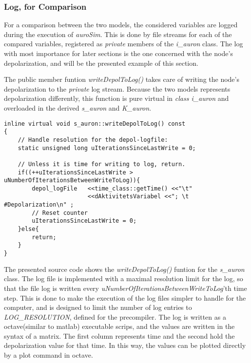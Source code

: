 		\subsubsection{Log, for Comparison}
			For a comparison between the two models, the considered variables are logged during the execution of \emph{auroSim}.
			This is done by file streams for each of the compared variables, registered as \emph{private} members of the \emph{i\_auron} class.
			The log with most importance for later sections is the one concerned with the node's depolarization, and will be the presented example of this section.

			The public member funtion \emph{writeDepolToLog()} takes care of writing the node's depolarization to the \emph{private} log stream.
			Because the two models represents depolarization differently, this function is pure virtual in \emph{class i\_auron} and overloaded in the derived \emph{s\_auron} and \emph{K\_auron}.

\begin{lstlisting}
inline virtual void s_auron::writeDepolToLog() const 
{
	// Handle resolution for the depol-logfile:
	static unsigned long uIterationsSinceLastWrite = 0;

	// Unless it is time for writing to log, return.
	if((++uIterationsSinceLastWrite > uNumberOfIterationsBetweenWriteToLog)){
		depol_logFile 	<<time_class::getTime() <<"\t" 
						<<dAktivitetsVariabel <<"; \t #Depolarization\n" ;
		// Reset counter
		uIterationsSinceLastWrite = 0;
	}else{
		return;
	}
}
\end{lstlisting}
			
			The presented source code shows the \emph{writeDepolToLog()} funtion for the \emph{s\_auron} class.
			The log file is implemented with a maximal resolution limit for the log, so that the file log is written every \emph{uNumberOfIterationsBetweenWriteToLog}'th time step.
			This is done to make the execution of the log files simpler to handle for the computer, and is designed to limit the number of log entries to \emph{LOG\_RESOLUTION}, defined for the precompiler.
			The log is written as a octave(similar to matlab) executable scrips, and the values are written in the syntax of a matrix.
			The first column represents time and the second hold the depolarization value for that time. 
			In this way, the values can be plotted directly by a plot command in octave.

